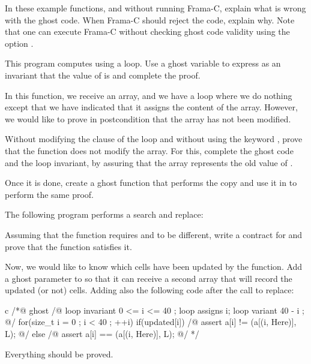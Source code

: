 



In these example functions, and without running Frama-C, explain what is
wrong with the ghost code. When Frama-C should reject the code, explain
why. Note that one can execute Frama-C without checking ghost code validity
using the option .






This program computes  using a loop. Use a ghost variable
 to express as an invariant that the value of 
is  and complete the proof.







In this function, we receive an array, and we have a loop where we do nothing
except that we have indicated that it assigns the content of the array. However,
we would like to prove in postcondition that the array has not been modified.





Without modifying the  clause of the loop and without using
the keyword , prove that the function does not
modify the array. For this, complete the ghost code and the loop invariant, by
assuring that the array  represents the old value of
.


Once it is done, create a ghost function that performs the copy and use it in
 to perform the same proof.




The following program performs a search and replace:




Assuming that the function  requires  and
 to be different, write a contract for 
and prove that the function satisfies it.


Now, we would like to know which cells have been updated by the function.
Add a ghost parameter to  so that it can receive a
second array that will record the updated (or not) cells. Adding also the
following code after the call to replace:


\begin{CodeBlock}{c}
/*@ ghost
  /@ loop invariant 0 <= i <= 40 ;
     loop assigns i;
     loop variant 40 - i ;
  @/
  for(size_t i = 0 ; i < 40 ; ++i){
    if(updated[i]){
      /@ assert a[i] != \at(a[\at(i, Here)], L); @/
    } else {
      /@ assert a[i] == \at(a[\at(i, Here)], L); @/
    }
  }
*/
\end{CodeBlock}


Everything should be proved.
